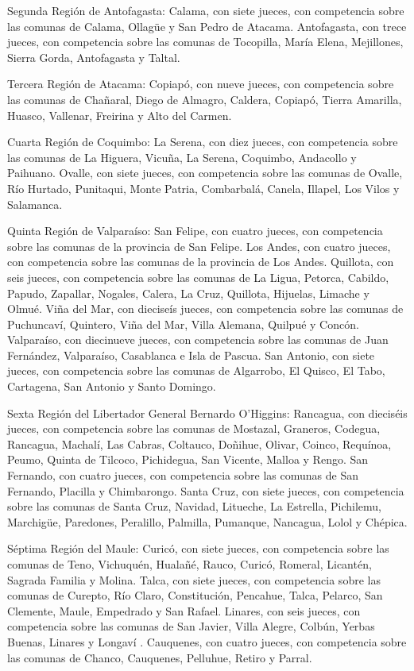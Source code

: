     Segunda Región de Antofagasta:
    Calama, con siete jueces, con competencia sobre las comunas de Calama, Ollagüe y San Pedro de Atacama.
    Antofagasta, con trece jueces, con competencia sobre las comunas de Tocopilla, María Elena, Mejillones, Sierra Gorda, Antofagasta y Taltal.

    Tercera Región de Atacama:
    Copiapó, con nueve jueces, con competencia sobre las comunas de Chañaral, Diego de Almagro, Caldera, Copiapó, Tierra Amarilla, Huasco, Vallenar, Freirina y Alto del Carmen.

    Cuarta Región de Coquimbo:
    La Serena, con diez jueces, con competencia sobre las comunas de La Higuera, Vicuña, La Serena, Coquimbo, Andacollo y Paihuano.
    Ovalle, con siete jueces, con competencia sobre las comunas de Ovalle, Río Hurtado, Punitaqui, Monte Patria, Combarbalá, Canela, Illapel, Los Vilos y Salamanca.

    Quinta Región de Valparaíso:
    San Felipe, con cuatro jueces, con competencia sobre las comunas de la provincia de San Felipe.
    Los Andes, con cuatro jueces, con competencia sobre las comunas de la provincia de Los Andes.
    Quillota, con seis jueces, con competencia sobre las comunas de La Ligua, Petorca, Cabildo, Papudo, Zapallar, Nogales, Calera, La Cruz, Quillota, Hijuelas, Limache y Olmué.
    Viña del Mar, con dieciseís jueces, con competencia sobre las comunas de Puchuncaví, Quintero, Viña del Mar, Villa Alemana, Quilpué y Concón.
    Valparaíso, con diecinueve jueces, con competencia sobre las comunas de Juan Fernández, Valparaíso, Casablanca e Isla de Pascua.
    San Antonio, con siete jueces, con competencia sobre las comunas de Algarrobo, El Quisco, El Tabo, Cartagena, San Antonio y Santo Domingo.

    Sexta Región del Libertador General Bernardo O'Higgins:
    Rancagua, con dieciséis jueces, con competencia sobre las comunas de Mostazal, Graneros, Codegua, Rancagua, Machalí, Las Cabras, Coltauco, Doñihue, Olivar, Coinco, Requínoa, Peumo, Quinta de Tilcoco, Pichidegua, San Vicente, Malloa y Rengo.
    San Fernando, con cuatro jueces, con competencia sobre las comunas de San Fernando, Placilla y Chimbarongo.
    Santa Cruz, con siete jueces, con competencia sobre las comunas de Santa Cruz, Navidad, Litueche, La Estrella, Pichilemu, Marchigüe, Paredones, Peralillo, Palmilla, Pumanque, Nancagua, Lolol y Chépica.

    Séptima Región del Maule:
    Curicó, con siete jueces, con competencia sobre las comunas de Teno, Vichuquén, Hualañé, Rauco, Curicó, Romeral, Licantén, Sagrada Familia y Molina.
    Talca, con siete jueces, con competencia sobre las comunas de Curepto, Río Claro, Constitución, Pencahue, Talca, Pelarco, San Clemente, Maule, Empedrado y San Rafael.
    Linares, con seis jueces, con competencia sobre las comunas de San Javier, Villa Alegre, Colbún, Yerbas Buenas, Linares y Longaví .
    Cauquenes, con cuatro jueces, con competencia sobre las comunas de Chanco, Cauquenes, Pelluhue, Retiro y Parral.

